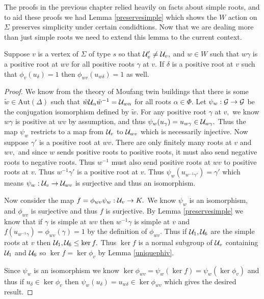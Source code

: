 \documentclass[class=book, crop=false]{standalone}
\begin{document}
The proofs in the previous chapter relied heavily on facts about simple roots, and to aid these proofs we had Lemma \ref{preservesimple} which shows the $W$ action on $\Sigma$ preserves simplicity under certain condidtions. Now that we are dealing more than just simple roots we need to extend this lemma to the current context.

\begin{lemma}
	\label{preservemapto1}
	Suppose $v$ is a vertex of $\Sigma$ of type $s$ so that $\mathcal{U}'_v\neq \mathcal{U}_v,$ and $w\in W$ such that $w\gamma$ is a positive root at $wv$ for all positive roots $\gamma$ at $v.$ If $\delta$ is a positive root at $v$ such that $\phi_v(u_\delta)=1$ then $\phi_{wv}(u_{w\delta})=1$ as well.
\end{lemma}
\begin{proof}
	We know from the theory of Moufang twin buildings that there is some $\tilde{w}\in \mathrm{Aut}(\Delta)$ such that $\tilde{w}\mathcal{U}_\alpha\tilde{w}^{-1}=\mathcal{U}_{w\alpha}$ for all roots $\alpha\in \Phi.$ Let $\psi_w:\mathcal{G}\to \mathcal{G}$ be the conjugation isomorphism defined by $\tilde{w}.$ For any positive root $\gamma$ at $v,$ we know $w\gamma$ is positive at $wv$ by assumption, and thus $\psi_w(u_\gamma)=u_{w\gamma}\in \mathcal{U}_{w\gamma}.$ Thus the map $\psi_w$ restricts to a map from $\mathcal{U}_v$ to $\mathcal{U}_{wv}$ which is necessarily injective. Now suppose $\gamma'$ is a positive root at $wv.$ There are only finitely many roots at $v$ and $wv,$ and since $w$ sends positive roots to positive roots, it must also send negative roots to negative roots. Thus $w^{-1}$ must also send positive roots at $wv$ to positive roots at $v.$ Thus $w^{-1}\gamma'$ is a positive root at $v.$ Thus $\psi_w(u_{w^{-1}\gamma'})=\gamma'$ which means $\psi_w:\mathcal{U}_v\to \mathcal{U}_{wv}$ is surjective and thus an isomorphism.

	Now consider the map $f=\phi_{wv}\psi_w:\mathcal{U}_v\to K.$ We know $\psi_w$ is an isomorphism, and $\phi_{wv}$ is surjective and thus $f$ is surjective. By Lemma \ref{preservesimple} we know that if $\gamma$ is simple at $wv$ then $w^{-1}\gamma$ is simple at $v$ and $f(u_{w^{-1}\gamma})=\phi_{wv}(\gamma)=1$ by the definition of $\phi_{wv}.$ Thus if $\mathcal{U}_1,\mathcal{U}_6$ are the simple roots at $v$ then $\mathcal{U}_1,\mathcal{U}_6\le \ker f.$ Thus $\ker f$ is a normal subgroup of $\mathcal{U}_v$ containing $\mathcal{U}_1$ and $\mathcal{U}_6$ so $\ker f=\ker \phi_v$ by Lemma \ref{uniquephiv}.

	Since $\psi_w$ is an isomorphism we know $\ker \phi_{wv}=\psi_w(\ker f)=\psi_w(\ker \phi_{v})$ and thus if $u_\delta\in \ker \phi_v$ then $\psi_w(u_\delta)=u_{w\delta}\in \ker \phi_{wv}$ which gives the desired result.
\end{proof}
\end{document}

